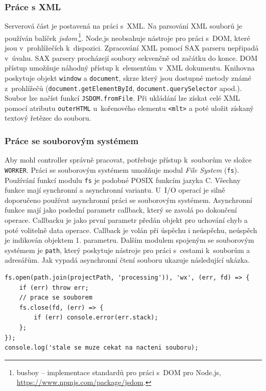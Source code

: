 \subsubsection{Práce s XML}
Serverová část je postavená na práci s~XML. Na parsování XML souborů je používán balíček \textit{jsdom}\,\footnote{busboy -- implementace standardů pro práci s~DOM pro Node.js, \url{https://www.npmjs.com/package/jsdom}.}. Node.js neobsahuje nástroje pro práci s~DOM, které jsou v~prohlížečích k~dispozici. Zpracování XML pomocí SAX parseru nepřipadá v~úvahu. SAX parsery procházejí soubory sekvenčně od začátku do konce. DOM přístup umožňuje náhodný přístup k~elementům v~XML dokumentu. Knihovna poskytuje objekt \texttt{window} a \texttt{document}, skrze který jsou dostupné metody známé z~prohlížečů (\texttt{document.getElementById}, \texttt{document.querySelector} apod.). Soubor lze načíst funkcí \texttt{JSDOM.fromFile}. Při ukládání lze získat celé XML pomocí atributu \texttt{outerHTML} u~kořenového elementu \texttt{<mlt>} a poté uložit získaný textový řetězec do souboru.

\subsubsection{Práce se souborovým systémem}
Aby mohl controller správně pracovat, potřebuje přístup k~souborům ve složce \texttt{WORKER}. Práci se souborovým systémem umožňuje modul \textit{File System} (\texttt{fs}). Používání funkcí modulu \texttt{fs} je podobné POSIX funkcím jazyka C. Všechny funkce mají synchronní a asynchronní variantu. U~I/O operací je silně doporučeno používat asynchronní práci se souborovým systémem. Asynchronní funkce mají jako poslední parametr callback, který se zavolá po dokončení operace. Callbacku je jako první parametr předán objekt pro uchování chyb a poté volitelně data operace. Callback je volán při úspěchu i neúspěchu, neúspěch je indikován objektem 1. parametru. Dalším modulem spojeným se souborovým systémem je \texttt{path}, který poskytuje nástroje pro práci s~cestami k~souborům a adresářům. Jak vypadá asynchronní čtení souboru ukazuje následující ukázka.
\begin{lstlisting}[style=JavaScript]
fs.open(path.join(projectPath, 'processing')), 'wx', (err, fd) => {
    if (err) throw err;
    // prace se souborem
    fs.close(fd, (err) => {
        if (err) console.error(err.stack);
    };
});
console.log('stale se muze cekat na nacteni souboru);
\end{lstlisting}

